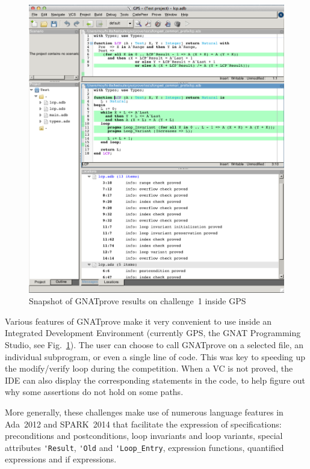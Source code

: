 \documentclass[sttt,final]{svjour}
\newcommand{\gnatprove}{GNATprove\xspace}
\newcommand{\newspark}{SPARK~2014\xspace}
\newcommand{\adatwtw}{Ada~2012\xspace}
\begin{document}
\begin{figure}
\includegraphics[width=\linewidth]{gnatprove.png}
\caption{Snapshot of GNATprove results on challenge~1 inside GPS}
\label{fig:snapshot}
\end{figure}


Various features of \gnatprove make it very convenient to use inside
an Integrated Development Environment (currently GPS, the GNAT
Programming Studio, see Fig.~\ref{fig:snapshot}). The user can choose
to call \gnatprove on a selected file, an individual subprogram, or
even a single line of code. This was key to speeding up the
modify/verify loop during the competition. When a VC is not proved,
the IDE can also display the corresponding statements in the code, to
help figure out why some assertions do not hold on some paths.

More generally, these challenges make use of numerous
language features in \adatwtw and \newspark that facilitate the
expression of specifications: preconditions and postconditions, loop
invariants and loop variants, special attributes \verb|'Result|,
\verb|'Old| and \verb|'Loop_Entry|, expression functions, quantified
expressions and if expressions.
\end{document}

